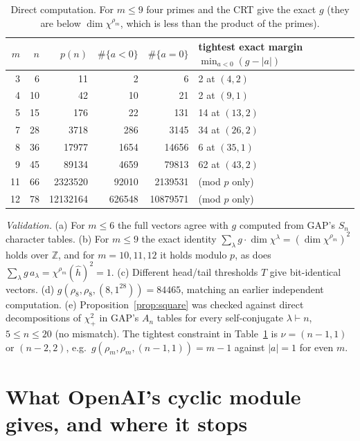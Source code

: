 \documentclass[11pt]{amsart}
\theoremstyle{remark}
\begin{document}
\begin{table}[h]\centering\small
\begin{tabular}{rrrrrl}\toprule
$m$&$n$&$p(n)$&$\#\{a<0\}$&$\#\{a=0\}$&tightest exact margin $\min_{a<0}(g-|a|)$\\\midrule
3&6&11&2&6&2 at $(4,2)$\\
4&10&42&10&21&2 at $(9,1)$\\
5&15&176&22&131&14 at $(13,2)$\\
7&28&3718&286&3145&34 at $(26,2)$\\
8&36&17977&1654&14656&6 at $(35,1)$\\
9&45&89134&4659&79813&62 at $(43,2)$\\
11&66&2323520&92010&2139531&(mod $p$ only)\\
12&78&12132164&626548&10879571&(mod $p$ only)\\\bottomrule
\end{tabular}
\caption{Direct computation. For $m\le9$ four primes and the CRT give the exact $g$ (they are
below $\dim\chi^{\rho_m}$, which is less than the product of the primes).}\label{tab}
\end{table}

\emph{Validation.} (a) For $m\le6$ the full vectors agree with $g$ computed from GAP's $S_n$
character tables. (b) For $m\le9$ the exact identity
$\sum_\lambda g\cdot\dim\chi^\lambda=(\dim\chi^{\rho_m})^2$ holds over $\mathbb Z$, and for
$m=10,11,12$ it holds modulo $p$, as does $\sum_\lambda g\,a_\lambda=\chi^{\rho_m}(\hat
h)^2=1$. (c) Different head/tail thresholds $T$ give bit-identical vectors.
(d) $g(\rho_8,\rho_8,(8,1^{28}))=84465$, matching an earlier independent computation.
(e) Proposition~\ref{prop:square} was checked against direct decompositions of $\chi_+^2$
in GAP's $A_n$ tables for every self-conjugate $\lambda\vdash n$, $5\le n\le20$ (no
mismatch). The tightest constraint in Table~\ref{tab} is $\nu=(n-1,1)$ or $(n-2,2)$, e.g.\
$g(\rho_m,\rho_m,(n-1,1))=m-1$ against $|a|=1$ for even $m$.

\section{What OpenAI's cyclic module gives, and where it stops}
\end{document}
